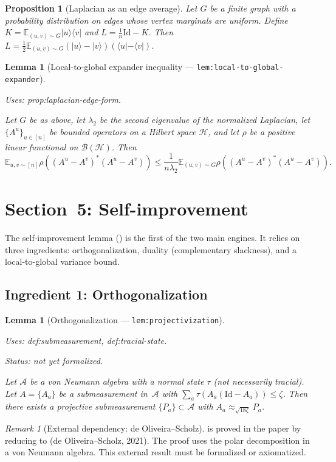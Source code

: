 \documentclass{article}
\providecommand{\uses}[1]{\par\smallskip\noindent\emph{Uses:} #1.\par\smallskip}
\providecommand{\notready}{\par\smallskip\noindent\emph{Status: not yet formalized.}\par\smallskip}
\newtheorem{lemma}[definition]{Lemma}
\newtheorem{proposition}[definition]{Proposition}
\theoremstyle{remark}
\newtheorem{remark}[definition]{Remark}
\newcommand{\E}{\mathbb{E}}
\newcommand{\id}{\mathrm{Id}}
\newcommand{\hilb}{\mathcal{H}}
\newcommand{\algebra}{\mathcal{A}}
\begin{document}
\begin{proposition}[Laplacian as an edge average]\label{prop:laplacian-edge-form}
	Let $G$ be a finite graph with a probability distribution on edges
	whose vertex marginals are uniform. Define
	$K=\E_{(u,v)\sim G}|u\rangle\langle v|$ and $L=\frac{1}{n}\id-K$. Then
	$L=\frac12\E_{(u,v)\sim G}(|u\rangle-|v\rangle)(\langle u|-\langle v|)$.
\end{proposition}

\begin{lemma}[Local-to-global expander inequality --- \texttt{lem:local-to-global-expander}]
	\label{lem:local-to-global-expander}
	\uses{prop:laplacian-edge-form}
	Let $G$ be as above, let $\lambda_2$ be the second eigenvalue of the
	normalized Laplacian, let $\{A^u\}_{u\in[n]}$ be bounded operators on a
	Hilbert space $\hilb$, and let $\rho$ be a positive linear functional on
	$\mathcal{B}(\hilb)$. Then
	\[
		\E_{u,v\sim[n]}\rho((A^u-A^v)^*(A^u-A^v))
		\le
		\frac{1}{n\lambda_2}
		\E_{(u,v)\sim G}\rho((A^u-A^v)^*(A^u-A^v)).
	\]
\end{lemma}

\section{Section~5: Self-improvement}
\label{sec:self-improvement}

The self-improvement lemma () is the first of the
two main engines. It relies on three ingredients: orthogonalization, duality
(complementary slackness), and a local-to-global variance bound.

\subsection{Ingredient 1: Orthogonalization}

\begin{lemma}[Orthogonalization --- \texttt{lem:projectivization}]
	\label{lem:projectivization}
	\uses{def:submeasurement, def:tracial-state}
	\notready
	Let $\algebra$ be a von Neumann algebra with a normal state $\tau$ (not
	necessarily tracial). Let $A=\{A_a\}$ be a submeasurement in~$\algebra$
	with $\sum_a\tau(A_a(\id-A_a))\le\zeta$. Then there exists a projective
	submeasurement $\{P_a\}\subset\algebra$ with
	$A_a\approx_{\sqrt{18\zeta}}P_a$.
\end{lemma}

\begin{remark}[External dependency: de Oliveira--Scholz]\label{rmk:projectivization-dep}
	 is proved in the paper by reducing to
	\cite[Theorem~1.2]{de2021orthogonalization} (de Oliveira--Scholz, 2021).
	The proof uses the polar decomposition in a von Neumann algebra.
	This external result must be formalized or axiomatized.
\end{remark}
\end{document}
